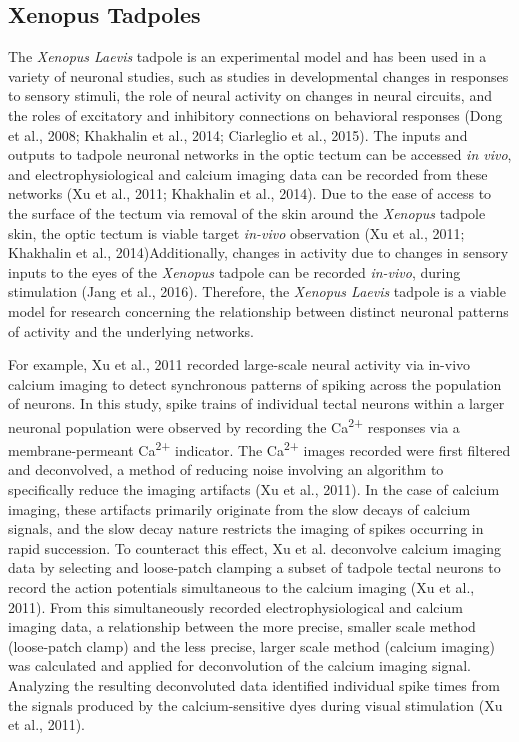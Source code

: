 \documentclass[11pt,titlepage]{article}
\begin{document}
\subsection{Xenopus Tadpoles}
The \textit{Xenopus Laevis} tadpole is an experimental model and has been used in a variety of neuronal studies, such as studies in developmental changes in responses to sensory stimuli, the role of neural activity on changes in neural circuits, and the roles of excitatory and inhibitory connections on behavioral responses (Dong et al., 2008; Khakhalin et al., 2014; Ciarleglio et al., 2015). The inputs and outputs to tadpole neuronal networks in the optic tectum can be accessed \textit{in vivo}, and electrophysiological and  calcium imaging data can be recorded from these networks (Xu et al., 2011; Khakhalin et al., 2014). Due to the ease of access to the surface of the tectum via removal of the skin around the \textit{Xenopus} tadpole skin, the optic tectum is viable target \textit{in-vivo} observation (Xu et al., 2011; Khakhalin et al., 2014)Additionally, changes in activity due to changes in sensory inputs to the eyes of the \textit{Xenopus} tadpole can be recorded \textit{in-vivo}, during stimulation (Jang et al., 2016). Therefore, the \textit{Xenopus Laevis} tadpole is a viable model for research concerning the relationship between distinct neuronal patterns of activity and the underlying networks.\par
For example, Xu et al., 2011 recorded large-scale neural activity via in-vivo calcium imaging to detect synchronous patterns of spiking across the population of neurons. In this study, spike trains of individual tectal neurons within a larger neuronal population were observed by recording the Ca\textsuperscript{2+} responses via a membrane-permeant Ca\textsuperscript{2+} indicator. The Ca\textsuperscript{2+} images recorded were first filtered and deconvolved, a method of reducing noise involving an algorithm to specifically reduce the imaging artifacts (Xu et al., 2011). In the case of calcium imaging, these artifacts primarily originate from the slow decays of calcium signals, and the slow decay nature restricts the imaging of spikes occurring in rapid succession. To counteract this effect, Xu et al. deconvolve calcium imaging data by selecting and loose-patch clamping a subset of tadpole tectal neurons to record the action potentials simultaneous to the calcium imaging (Xu et al., 2011). From this simultaneously recorded electrophysiological and calcium imaging data, a relationship between the more precise, smaller scale method (loose-patch clamp) and the less precise, larger scale method (calcium imaging) was calculated and applied for deconvolution of the calcium imaging signal. Analyzing the resulting deconvoluted data identified individual spike times from the signals produced by the calcium-sensitive dyes during visual stimulation (Xu et al., 2011).\par
\end{document}

